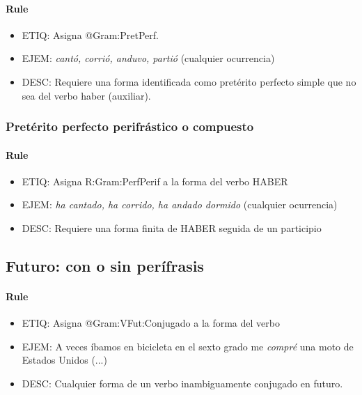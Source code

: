 \documentclass[11pt]{report}
\begin{document}
\paragraph*{Rule}
\begin{itemize}
\item ETIQ: Asigna @Gram:PretPerf.
\item EJEM: \emph{cantó, corrió, anduvo, partió} (cualquier ocurrencia)
\item DESC: Requiere una forma identificada como pretérito perfecto simple que no sea del verbo haber (auxiliar).
\end{itemize}

\subsubsection{Pretérito perfecto perifrástico o compuesto}\label{sec:HaberAuxPretPerfecto}
\paragraph*{Rule}
\begin{itemize}
\item ETIQ: Asigna R:Gram:PerfPerif a la forma del verbo HABER
\item EJEM: \emph{ha cantado, ha corrido, ha andado dormido} (cualquier ocurrencia)
\item DESC: Requiere una forma finita de HABER seguida de un participio
\end{itemize}

\subsection{Futuro: con o sin perífrasis}
\paragraph*{Rule}
\begin{itemize}
\item ETIQ: Asigna @Gram:VFut:Conjugado a la forma del verbo
\item EJEM: A veces íbamos en bicicleta en el sexto grado me \emph{compré} una moto de Estados Unidos (...)
\item DESC: Cualquier forma de un verbo inambiguamente conjugado en futuro.
\end{itemize}
\end{document}
